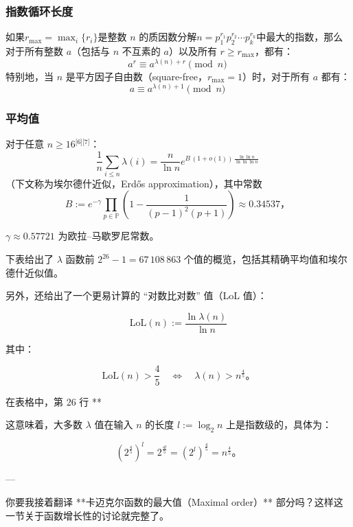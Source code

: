 \subsubsection{指数循环长度}
如果$r_{\mathrm{max}} = \max_{i} \{ r_{i} \}$是整数 $n$ 的质因数分解$n = p_{1}^{r_{1}} p_{2}^{r_{2}} \cdots p_{k}^{r_{k}}$中最大的指数，那么对于所有整数 $a$（包括与 $n$ 不互素的 $a$）以及所有 $r \ge r_{\mathrm{max}}$，都有：
$$
a^{r} \equiv a^{\lambda(n) + r} \pmod{n}~
$$
特别地，当 $n$ 是平方因子自由数（square-free，$r_{\mathrm{max}} = 1$）时，对于所有 $a$ 都有：
$$
a \equiv a^{\lambda(n) + 1} \pmod{n}~
$$
\subsubsection{平均值}
对于任意 $n \ge 16$\(^\text{[6][7]}\)：
$$
\frac{1}{n} \sum_{i \le n} \lambda(i) = \frac{n}{\ln n} e^{B \,(1 + o(1)) \,\frac{\ln \ln n}{\ln \ln \ln n}}~
$$
（下文称为埃尔德什近似，Erdős approximation），其中常数
$$
B := e^{-\gamma} \prod_{p \in \mathbb{P}} \left( 1 - \frac{1}{(p - 1)^{2}(p + 1)} \right) \approx 0.34537，~
$$

$\gamma \approx 0.57721$ 为欧拉–马歇罗尼常数。

下表给出了 $\lambda$ 函数前 $2^{26} - 1 = 67\,108\,863$ 个值的概览，包括其精确平均值和埃尔德什近似值。

另外，还给出了一个更易计算的 “对数比对数” 值（LoL 值）：

$$
\mathrm{LoL}(n) := \frac{\ln \lambda(n)}{\ln n}
$$

其中：

$$
\mathrm{LoL}(n) > \frac{4}{5} \quad \Leftrightarrow \quad \lambda(n) > n^{\frac{4}{5}}。
$$

在表格中，第 26 行 **%

这意味着，大多数 $\lambda$ 值在输入 $n$ 的长度 $l := \log_{2} n$ 上是指数级的，具体为：

$$
\left( 2^{\frac{4}{5}} \right)^{l} = 2^{\frac{4l}{5}} = \left( 2^{l} \right)^{\frac{4}{5}} = n^{\frac{4}{5}}。
$$

---

你要我接着翻译 **卡迈克尔函数的最大值（Maximal order）** 部分吗？这样这一节关于函数增长性的讨论就完整了。
